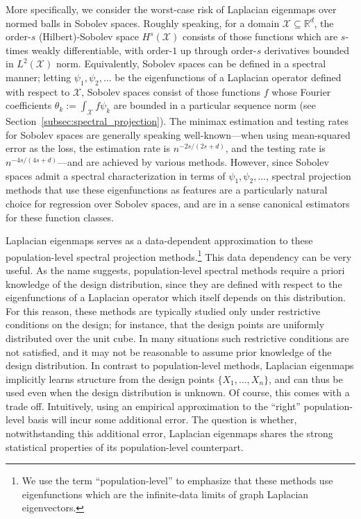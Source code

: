 \documentclass[aos]{imsart}
\theoremstyle{plain}
\theoremstyle{definition}
\theoremstyle{remark}
\def\R{\mathbb{R}}
\newcommand{\mc}[1]{\mathcal{#1}}
\newcommand{\Reals}{\mathbb{R}} %
\newcommand{\Rd}{\Reals^d}
\newcommand{\1}{\mathbf{1}}
\begin{document}
More specifically, we consider the worst-case risk of Laplacian eigenmaps over normed balls in Sobolev spaces. Roughly speaking, for a domain $\mc{X} \subseteq \Rd$, the order-$s$ (Hilbert)-Sobolev space $H^s(\mc{X})$ consists of those functions which are $s$-times weakly differentiable, with order-$1$ up through order-$s$ derivatives bounded in $L^2(\mc{X})$ norm. Equivalently, Sobolev spaces can be defined in a spectral manner;  letting $\psi_1,\psi_2,\ldots$ be the eigenfunctions of a Laplacian operator defined with respect to $\mc{X}$, Sobolev spaces consist of those functions $f$ whose Fourier coefficients $\theta_k := \int_{\mc{X}} f \psi_k$ are bounded in a particular sequence norm (see Section~\ref{subsec:spectral_projection}). The minimax estimation and testing rates for Sobolev spaces are generally speaking well-known---when using mean-squared error as the loss, the estimation rate is $n^{-2s/(2s + d)}$, and the testing rate is $n^{-4s/(4s + d)}$---and are achieved by various methods. However, since Sobolev spaces admit a spectral characterization in terms of $\psi_1,\psi_2,\ldots$, spectral projection methods that use these eigenfunctions as features are a particularly natural choice for regression over Sobolev spaces, and are in a sense canonical estimators for these function classes. 

Laplacian eigenmaps serves as a data-dependent approximation to these population-level spectral projection methods.\footnote{We use the term ``population-level'' to emphasize that these methods use eigenfunctions which are the infinite-data limits of graph Laplacian eigenvectors.} This data dependency can be very useful. As the name suggests, population-level spectral methods require a priori knowledge of the design distribution, since they are defined with respect to the eigenfunctions of a Laplacian operator which itself depends on this distribution. For this reason, these methods are typically studied only under restrictive conditions on the design; for instance, that the design points are uniformly distributed over the unit cube. In many situations such restrictive conditions are not satisfied, and it may not be reasonable to assume prior knowledge of the design distribution. In contrast to population-level methods, Laplacian eigenmaps implicitly learns structure from the design points $\{X_1,\ldots,X_n\}$, and can thus be used even when the design distribution is unknown. Of course, this comes with a trade off. Intuitively, using an empirical approximation to the ``right'' population-level basis will incur some additional error. The question is whether, notwithstanding this additional error, Laplacian eigenmaps shares the strong statistical properties of its population-level counterpart.
\end{document}
